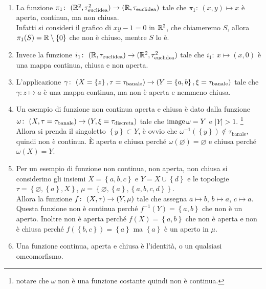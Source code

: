 \begin{example} \
\begin{enumerate}
	\item La funzione $\pi_1 \colon\ (\mathbb{R}^2,\tau^2_{\text{euclidea}}) \rightarrow (\mathbb{R},\tau_{\text{euclidea}})$ tale che $\pi_1 \colon\ (x,y) \mapsto x$ è aperta, continua, ma non chiusa. \\ Infatti si consideri il grafico di $xy - 1 = 0$ in $\mathbb{R}^2$, che chiameremo $S$, allora $\pi_1(S) = \mathbb{R} \setminus \left\{0\right\}$ che non è chiuso, mentre $S$ lo è.
	\item Invece la funzione $i_1 \colon\ (\mathbb{R},\tau_{\text{euclidea}}) \rightarrow (\mathbb{R}^2,\tau^2_{\text{euclidea}})$ tale che $i_1 \colon\ x \mapsto (x,0)$ è una mappa continua, chiusa e non aperta. 
	\item L'applicazione $\gamma \colon\ (X = \left\{z\right\},\tau =\tau_{\text{banale}}) \rightarrow (Y = \left\{a,b\right\},\xi = \tau_{\text{banale}})$ tale che  $\gamma \colon z \mapsto a$ è una mappa continua, ma non è aperta e nemmeno chiusa.
	\item Un esempio di funzione non continua aperta e chiusa è dato dalla funzione $\omega \colon\ (X,\tau =\tau_{\text{banale}}) \rightarrow (Y,\xi = \tau_{\text{discreta}})$ tale che $\operatorname{image}{\omega} = Y$ e $|Y| > 1$.
	\footnote{notare che $\omega$ non è una funzione costante quindi non è continua.}
	 Allora si prenda il singoletto $\left\{y\right\} \subset Y$, è ovvio che $\omega^{-1}(\left\{y\right\}) \notin \tau_{\text{banale}}$, quindi non è continua. È aperta e chiusa perché $\omega(\varnothing) = \varnothing$ e chiusa perché $\omega(X) = Y$.
	\item Per un esempio di funzione non continua, non aperta, non chiusa si considerino gli insiemi $X = \left\{a,b,c\right\}$ e $Y = X \cup \left\{d\right\}$ e le topologie $\tau = \left\{\varnothing, \left\{a\right\}, X\right\}$, $\mu = \left\{ \varnothing, \left\{a\right\}, \left\{a,b,c,d\right\}\right\}$. \\ Allora la funzione $f \colon\ (X,\tau) \rightarrow (Y,\mu)$ tale che assegna $a \mapsto b$, $b \mapsto a$, $c \mapsto a$. Questa funzione non è continua perché $f^{-1}(Y) = \left\{a,b\right\}$ che non è un aperto. Inoltre non è aperta perché $f(X) = \left\{a,b\right\}$ che non è aperta e non è chiusa perché $f(\left\{b,c\right\}) = \left\{a\right\}$ ma $\left\{a\right\}$ è un aperto in $\mu$.
	\item Una funzione continua, aperta e chiusa è l'identità, o un qualsiasi omeomorfismo.

\end{enumerate}
\end{example}
